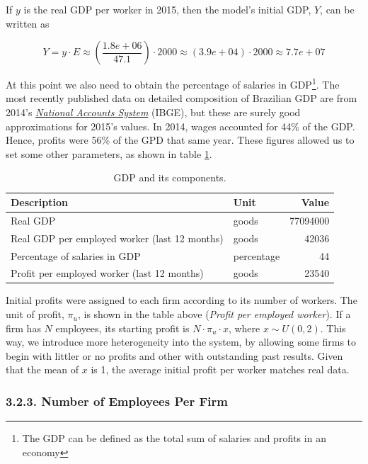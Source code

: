 \documentclass[11pt,]{article}
\begin{document}
If \(y\) is the real GDP per worker in 2015, then the model's initial
GDP, \(Y\), can be written as

\begin{equation}
Y = y \cdot E \approx \left(\frac{1.8e+06}{47.1}\right) \cdot 2000 \approx (3.9e+04) \cdot 2000 \approx 7.7e+07 
\end{equation}

At this point we also need to obtain the percentage of salaries in
GDP\footnote{The GDP can be defined as the total sum of salaries and
  profits in an economy}. The most recently published data on detailed
composition of Brazilian GDP are from 2014's
\href{https://ww2.ibge.gov.br/home/estatistica/economia/contasnacionais/2014/defaulttab_xls.shtm}{\emph{National
Accounts System}} (IBGE), but these are surely good approximations for
2015's values. In 2014, wages accounted for 44\% of the GDP. Hence,
profits were 56\% of the GPD that same year. These figures allowed us to
set some other parameters, as shown in table \ref{tab:gdp}.

\begin{table}

\caption{\label{tab:unnamed-chunk-10}\label{tab:gdp}GDP and its components.}
\centering
\begin{tabular}[t]{llr}
\toprule
Description & Unit & Value\\
\midrule
Real GDP & goods & 77094000\\
Real GDP per employed worker (last 12 months) & goods & 42036\\
Percentage of salaries in GDP & percentage & 44\\
Profit per employed worker (last 12 months) & goods & 23540\\
\bottomrule
\end{tabular}
\end{table}

Initial profits were assigned to each firm according to its number of
workers. The unit of profit, \(\pi_u\), is shown in the table above
(\emph{Profit per employed worker}). If a firm has \(N\) employees, its
starting profit is \(N \cdot \pi_u \cdot x\), where \(x \sim U(0,2)\).
This way, we introduce more heterogeneity into the system, by allowing
some firms to begin with littler or no profits and other with
outstanding past results. Given that the mean of \(x\) is 1, the average
initial profit per worker matches real data.

\subsubsection{3.2.3. Number of Employees Per
Firm}\label{number-of-employees-per-firm}
\end{document}
